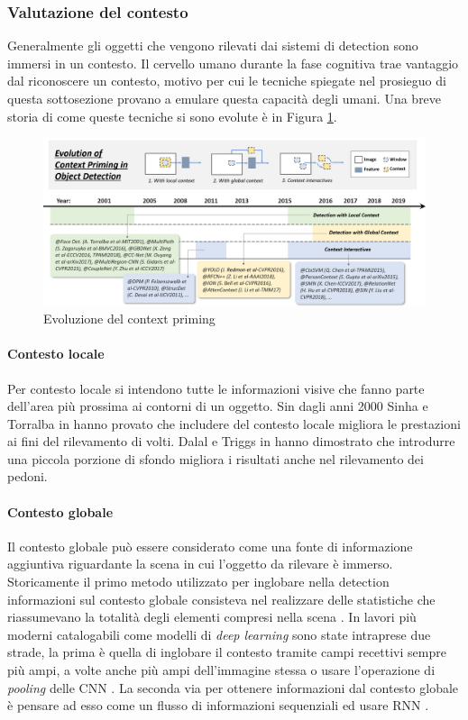 \subsubsection{Valutazione del contesto}
Generalmente gli oggetti che vengono rilevati dai sistemi di detection sono immersi in un contesto. Il cervello umano durante la fase cognitiva trae vantaggio dal riconoscere un contesto, motivo per cui le tecniche spiegate nel prosieguo di questa sottosezione provano a emulare questa capacità degli umani. Una breve storia di come queste tecniche si sono evolute è in Figura \ref{fig:context_history}.
\begin{figure}
    \centering
    \includegraphics[width=\textwidth]{images/evol-context.png}
    \caption{Evoluzione del context priming \cite{DBLP:journals/corr/abs-1905-05055}}
    \label{fig:context_history}
\end{figure}
\paragraph{Contesto locale}
Per contesto locale si intendono tutte le informazioni visive che fanno parte dell'area più prossima ai contorni di un oggetto. Sin dagli anni 2000 Sinha e Torralba in \cite{torralba2001detecting} hanno provato che includere del contesto locale migliora le prestazioni ai fini del rilevamento di volti. Dalal e Triggs in \cite{dalal2005histograms} hanno dimostrato che introdurre una piccola porzione di sfondo migliora i risultati anche nel rilevamento dei pedoni. 
\paragraph{Contesto globale}
Il contesto globale può essere considerato come una fonte di informazione aggiuntiva riguardante la scena in cui l'oggetto da rilevare è immerso. Storicamente il primo metodo utilizzato per inglobare nella detection informazioni sul contesto globale consisteva nel realizzare delle statistiche che riassumevano la totalità degli elementi compresi nella scena \cite{divvala2009empirical}. In lavori più moderni catalogabili come modelli di \textit{deep learning} sono state intraprese due strade, la prima è quella di inglobare il contesto tramite campi recettivi sempre più ampi, a volte anche più ampi dell'immagine stessa \cite{redmon2016you} o  usare l'operazione di \textit{pooling} delle \ac{CNN} \cite{li2018r}. La seconda via per ottenere informazioni dal contesto globale è pensare ad esso come un flusso di informazioni sequenziali ed usare \ac{RNN} \cite{bell2016inside, li2016attentive}. 
